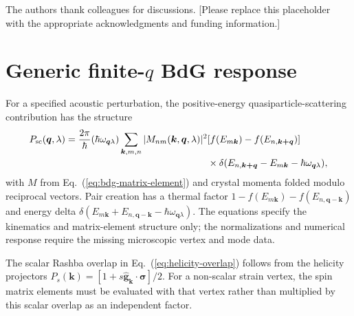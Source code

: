 \documentclass[aps,prb,preprint,superscriptaddress]{revtex4-2}
\begin{document}
\begin{acknowledgments}
The authors thank colleagues for discussions. [Please replace this placeholder with the appropriate acknowledgments and funding information.]
\end{acknowledgments}

\appendix
\section{Generic finite-$q$ BdG response}

For a specified acoustic perturbation, the positive-energy quasiparticle-scattering contribution has the structure
\begin{align}
 P_{\mathrm{sc}}(\bm q,\lambda)={2\pi\over\hbar}(\hbar\omega_{\bm q\lambda})
 \sum_{\bm k,m,n}|M_{nm}(\bm k,\bm q,\lambda)|^2
 &[f(E_{m\bm k})-f(E_{n,\bm{k+q}})]\\[-2pt]
 &\times\delta(E_{n,\bm{k+q}}-E_{m\bm k}-\hbar\omega_{\bm q\lambda}),
 \label{eq:finiteq-sc}
\end{align}
with $M$ from Eq.~(\ref{eq:bdg-matrix-element}) and crystal momenta folded modulo reciprocal vectors. Pair creation has a thermal factor $1-f(E_{m\bm k})-f(E_{n,\bm{q-k}})$ and energy delta $\delta(E_{m\bm k}+E_{n,\bm{q-k}}-\hbar\omega_{\bm q\lambda})$. The equations specify the kinematics and matrix-element structure only; the normalizations and numerical response require the missing microscopic vertex and mode data.

The scalar Rashba overlap in Eq.~(\ref{eq:helicity-overlap}) follows from the helicity projectors $P_s(\bm k)=[1+s\hat{\bm g}_{\bm k}\cdot\bm\sigma]/2$. For a non-scalar strain vertex, the spin matrix elements must be evaluated with that vertex rather than multiplied by this scalar overlap as an independent factor.



\end{document}
